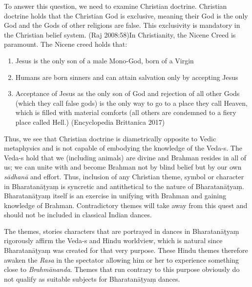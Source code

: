 To answer this question, we need to examine Christian doctrine. Christian doctrine holds that the Christian God is exclusive, meaning their God is the only God and the Gods of other religions are false. This exclusivity is mandatory in the Christian belief system. (Raj 2008:58)In Christianity, the Nicene Creed is paramount. The Nicene creed holds that:

\begin{enumerate}[{\rm 1)}]
\itemsep=0pt
\item Jesus is the only son of a male Mono-God, born of a Virgin 

 \item Humans are born sinners and can attain salvation only by accepting Jesus

 \item Acceptance of Jesus as the only son of God and rejection of all other Gods (which they call false gods) is the only way to go to a place they call Heaven, which is filled with material comforts (all others are condemned to a fiery place called Hell.) (Encyclopedia Brittanica 2017)

\end{enumerate}

Thus, we see that Christian doctrine is diametrically opposite to Vedic metaphysics and is not capable of embodying the knowledge of the Veda-s. The Veda-s hold that we (including animals) are divine and Brahman resides in all of us; we can unite with and become Brahman not by blind belief but by our own \textit{sādhanā} and effort. Thus, inclusion of any Christian theme, symbol or character in Bharatanāṭyaṃ is syncretic and antithetical to the nature of Bharatanāṭyaṃ. Bharatanāṭyaṃ itself is an exercise in unifying with Brahman and gaining knowledge of Brahman. Contradictory themes will take away from this quest and should not be included in classical Indian dances.

The themes, stories characters that are portrayed in dances in Bharatanāṭyaṃ rigorously affirm the Veda-s and Hindu worldview, which is natural since Bharatanāṭyaṃ was created for that very purpose. These Hindu themes therefore awaken the \textit{Rasa} in the spectator allowing him or her to experience something close to \textit{Brahmānanda}. Themes that run contrary to this purpose obviously do not qualify as suitable subjects for Bharatanāṭyaṃ dances.

